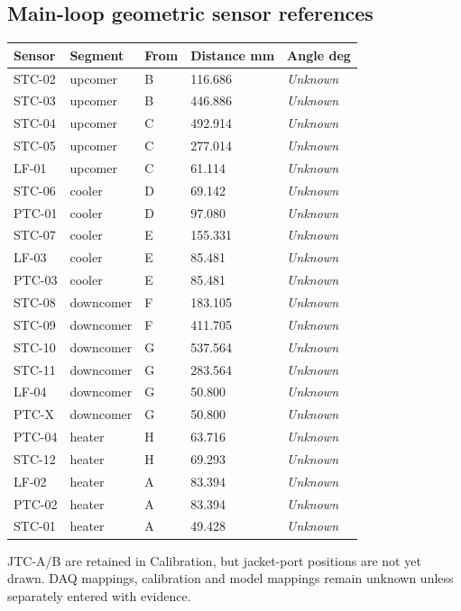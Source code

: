 \documentclass[11pt]{article}
\begin{document}
\subsection*{Main-loop geometric sensor references}
\small\setlength{\tabcolsep}{4pt}
\begin{longtable}{p{}p{}p{}p{}p{}}
\toprule
\textbf{Sensor} & \textbf{Segment} & \textbf{From} & \textbf{Distance mm} & \textbf{Angle deg} \\\midrule\endhead
STC-02 & upcomer & B & 116.686 & \textit{Unknown} \\[3pt]
STC-03 & upcomer & B & 446.886 & \textit{Unknown} \\[3pt]
STC-04 & upcomer & C & 492.914 & \textit{Unknown} \\[3pt]
STC-05 & upcomer & C & 277.014 & \textit{Unknown} \\[3pt]
LF-01 & upcomer & C & 61.114 & \textit{Unknown} \\[3pt]
STC-06 & cooler & D & 69.142 & \textit{Unknown} \\[3pt]
PTC-01 & cooler & D & 97.080 & \textit{Unknown} \\[3pt]
STC-07 & cooler & E & 155.331 & \textit{Unknown} \\[3pt]
LF-03 & cooler & E & 85.481 & \textit{Unknown} \\[3pt]
PTC-03 & cooler & E & 85.481 & \textit{Unknown} \\[3pt]
STC-08 & downcomer & F & 183.105 & \textit{Unknown} \\[3pt]
STC-09 & downcomer & F & 411.705 & \textit{Unknown} \\[3pt]
STC-10 & downcomer & G & 537.564 & \textit{Unknown} \\[3pt]
STC-11 & downcomer & G & 283.564 & \textit{Unknown} \\[3pt]
LF-04 & downcomer & G & 50.800 & \textit{Unknown} \\[3pt]
PTC-X & downcomer & G & 50.800 & \textit{Unknown} \\[3pt]
PTC-04 & heater & H & 63.716 & \textit{Unknown} \\[3pt]
STC-12 & heater & H & 69.293 & \textit{Unknown} \\[3pt]
LF-02 & heater & A & 83.394 & \textit{Unknown} \\[3pt]
PTC-02 & heater & A & 83.394 & \textit{Unknown} \\[3pt]
STC-01 & heater & A & 49.428 & \textit{Unknown} \\[3pt]
\bottomrule\end{longtable}\normalsize
JTC-A/B are retained in Calibration, but jacket-port positions are not yet drawn. DAQ mappings, calibration and model mappings remain unknown unless separately entered with evidence.
\end{document}
